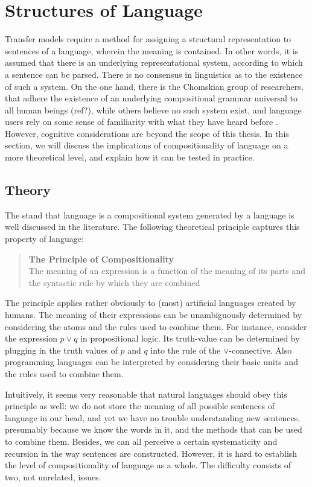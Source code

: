 \documentclass{report}
\theoremstyle{break}
\begin{document}
\section{Structures of Language}

Transfer models require a method for assigning a structural representation to sentences of a language, wherein the meaning is contained. In other words, it is assumed that there is an underlying representational system, according to which a sentence can be parsed. There is no consensus in linguistics as to the existence of such a system. On the one hand, there is the Chomskian group of researchers, that adhere the existence of an underlying compositional grammar universal to all human beings (ref?), while others believe no such system exist, and language users rely on some sense of familiarity with what they have heard before \citep[e.g.,][]{frank2012hierarchical}. However, cognitive considerations are beyond the scope of this thesis. In this section, we will discuss the implications of compositionality of language on a more theoretical level, and explain how it can be tested in practice.

\subsection{Theory}

The stand that language is a compositional system generated by a language is well discussed in the literature. The following theoretical principle captures this property of language:

\begin{quote}
\textbf{The Principle of Compositionality}\\
The meaning of an expression is a function of the meaning of its parts and the syntactic rule by which they are combined \citep{partee1984compositionality}
\end{quote}

The principle applies rather obviously to (most) artificial languages created by humans. The meaning of their expressions can be unambiguously determined by considering the atoms and the rules used to combine them. For instance, consider the expression $p\lor q$ in propositional logic. Its truth-value can be determined by plugging in the truth values of $p$ and $q$ into the rule of the $\lor$-connective. Also programming languages can be interpreted by considering their basic units and the rules used to combine them.

Intuitively, it seems very reasonable that natural languages should obey this principle as well: we do not store the meaning of all possible sentences of language in our head, and yet we have no trouble understanding new sentences, presumably because we know the words in it, and the methods that can be used to combine them. Besides, we can all perceive a certain systematicity and recursion in the way sentences are constructed. However, it is hard to establish the level of compositionality of language as a whole. The difficulty consists of two, not unrelated, issues.
\end{document}
